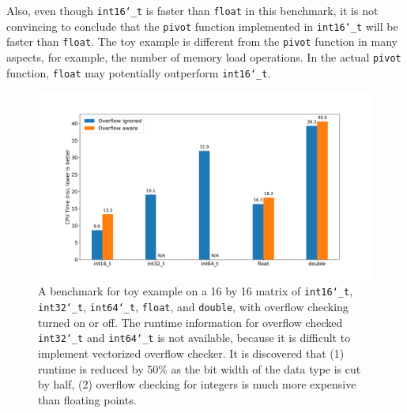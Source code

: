 \documentclass[logo,bsc,singlespacing,parskip]{infthesis}
\newcommand{\dtshort}{\texttt{int16\char`_t}}
\newcommand{\dtint}{\texttt{int32\char`_t}}
\newcommand{\dtlong}{\texttt{int64\char`_t}}
\newcommand{\dtfloat}{\texttt{float}}
\newcommand{\dtdouble}{\texttt{double}}
\newcommand{\pivot}{\texttt{pivot}}
\begin{document}
Also, even though \dtshort{} is faster than \dtfloat{} in this benchmark, it is
not convincing to conclude that the \pivot{} function implemented in \dtshort{}
will be faster than \dtfloat{}. The toy example is different from the \pivot{}
function in many aspects, for example, the number of memory load operations. In
the actual \pivot{} function, \dtfloat{} may potentially outperform \dtshort{}. 

\begin{figure}[H]\captionsetup{name=Figure}
    \begin{center}
        \includegraphics[width=\linewidth]{image/bench_datatype.png}
    \end{center}
    \caption{ A benchmark for toy example on a 16 by 16 matrix of \dtshort{},
\dtint{}, \dtlong{}, \dtfloat{}, and \dtdouble{}, with overflow checking turned
on or off. The runtime information for overflow checked \dtint{} and \dtlong{}
is not available, because it is difficult to implement vectorized overflow
checker. It is discovered that (1) runtime is
reduced by 50\% as the bit width of the data type is cut by half, (2) overflow
checking for integers is much more expensive than floating points. }
    \label{bench_datatype}
\end{figure}



\end{document}
